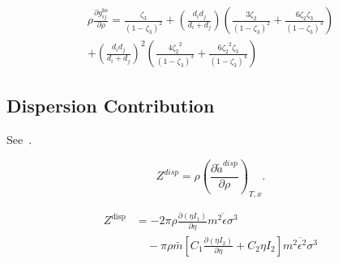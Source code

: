 \documentclass[12pt, letterpaper]{article}
\begin{document}
\begin{equation}
    \begin{aligned}
        \rho\frac{\partial g_{ij}^{\mathrm{hs}}}{\partial\rho}=\frac{\zeta_{3}}{\left(1-\zeta_{3}\right)^{2}}+\left(\frac{d_{i}d_{j}}{d_{i}+d_{j}}\right)\left(\frac{3\zeta_{2}}{\left(1-\zeta_{3}\right)^{2}}+\frac{6\zeta_{2}\zeta_{3}}{\left(1-\zeta_{3}\right)^{3}}\right) \\+\left(\frac{d_{i}d_{j}}{d_{i}+d_{j}}\right)^{2}\left(\frac{4{\zeta_{2}}^{2}}{\left(1-{\zeta_{3}}\right)^{3}}+\frac{6{\zeta_{2}}^{2}\zeta_{3}}{\left(1-{\zeta_{3}}\right)^{4}}\right)
    \end{aligned}
    \label{eq:dg_hs_drho}
\end{equation}

\subsection{Dispersion Contribution}

See~\cite{Gross2001}.

\begin{equation}
    Z^{disp} =\rho\left(\frac{\partial\tilde{a}^{disp}}{\partial\rho}\right)_{T,x}
    .
    \label{eq:z_disp}
\end{equation}


\begin{equation}
    \begin{aligned}
        Z^{\mathrm{disp}}
        &=-2\pi\rho\frac{\partial(\eta I_{1})}{\partial\eta}\overline{m^{2}\epsilon\sigma^{3}}
        \\
        &\quad -\pi\rho\bar{m}\left[C_{1}\frac{\partial(\eta I_{2})}{\partial\eta}+C_{2}\eta I_{2}\right]\overline{m^{2}\epsilon^{2}\sigma^{3}}
    \end{aligned}
    \label{eq:z_disp_explicit}
\end{equation}

\end{document}
